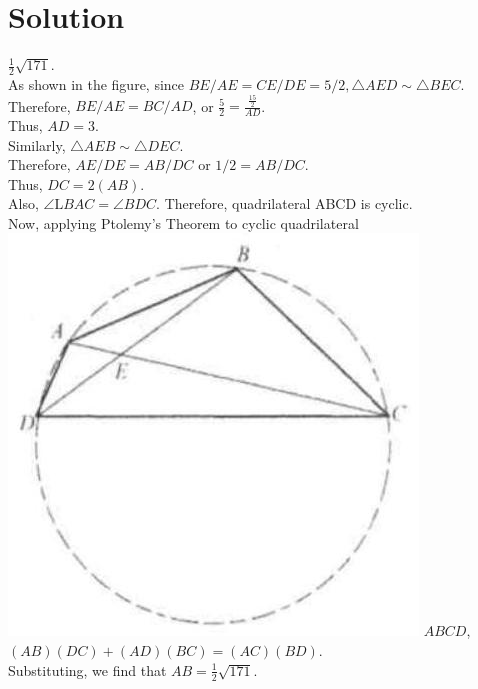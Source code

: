 \documentclass{article}
\begin{document}
\section*{Solution}
\(\frac{1}{2} \sqrt{171}\).\\
As shown in the figure, since \(B E / A E=C E / D E=5 / 2, \triangle A E D \sim \triangle B E C\). Therefore, \(B E / A E=B C / A D\), or \(\frac{5}{2}=\frac{\frac{15}{2}}{A D}\).\\
Thus, \(A D=3\).\\
Similarly, \(\triangle A E B \sim \triangle D E C\).\\
Therefore, \(A E / D E=A B / D C\) or \(1 / 2=A B / D C\).\\
Thus, \(D C=2(A B)\).\\
Also, \(\angle \mathrm{L} B A C=\angle B D C\). Therefore, quadrilateral ABCD is cyclic.\\
Now, applying Ptolemy's Theorem to cyclic quadrilateral\\
\includegraphics[width=\textwidth]{images/212(1).jpg} \(A B C D\), \((A B)(D C)+(A D)(B C)=(A C)(B D)\).\\
Substituting, we find that \(A B=\frac{1}{2} \sqrt{171}\).
\end{document}
